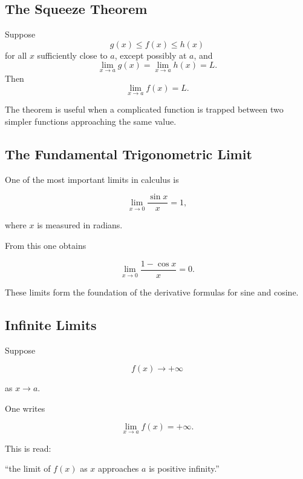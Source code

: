 \subsection{The Squeeze Theorem}
\label{subsec:squeeze-theorem}

\begin{theorem}
Suppose
\[ g(x)\leq f(x)\leq h(x) \]
for all \(x\) sufficiently close to \(a\), except possibly at \(a\), and
\[ \lim_{x\to a}g(x)
=
\lim_{x\to a}h(x)
=L. \]
Then
\[ \lim_{x\to a}f(x)=L. \]
\end{theorem}

The theorem is useful when a complicated function is trapped between two
simpler functions approaching the same value.

\subsection{The Fundamental Trigonometric Limit}
\label{subsec:fundamental-trig-limit}

One of the most important limits in calculus is

\[ \boxed{\lim_{x\to0}\frac{\sin x}{x}=1,} \]

where \(x\) is measured in radians.

From this one obtains

\[ \lim_{x\to0}\frac{1-\cos x}{x}=0. \]

These limits form the foundation of the derivative formulas for sine and
cosine.

\subsection{Infinite Limits}
\label{subsec:infinite-limits}

Suppose

\[ f(x)\to+\infty \]

as \(x\to a\).

One writes

\[ \lim_{x\to a}f(x)=+\infty. \]

This is read:

``the limit of \(f(x)\) as \(x\) approaches \(a\) is positive infinity.''

